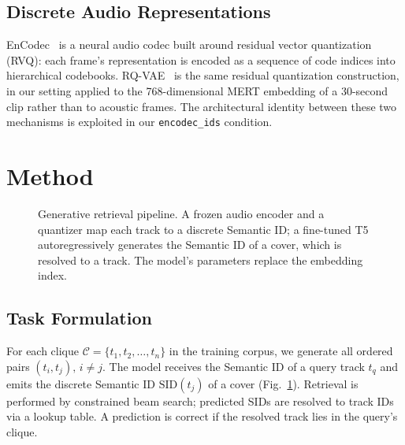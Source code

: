 \documentclass[conference]{IEEEtran}
\begin{document}
\subsection{Discrete Audio Representations}
EnCodec~\cite{defossez2022encodec} is a neural audio codec built around residual vector quantization (RVQ): each frame's representation is encoded as a sequence of code indices into hierarchical codebooks. RQ-VAE~\cite{lee2022rqvae, zeghidour2021soundstream} is the same residual quantization construction, in our setting applied to the 768-dimensional MERT embedding of a 30-second clip rather than to acoustic frames. The architectural identity between these two mechanisms is exploited in our \texttt{encodec\_ids} condition.

\section{Method}

\begin{figure}[t]
\centering
{}
\caption{Generative retrieval pipeline. A frozen audio encoder and a quantizer map each track to a discrete Semantic ID; a fine-tuned T5 autoregressively generates the Semantic ID of a cover, which is resolved to a track. The model's parameters replace the embedding index.}
\label{fig:pipeline}
\end{figure}

\subsection{Task Formulation}
For each clique $\mathcal{C} = \{t_1, t_2, \ldots, t_n\}$ in the training corpus, we generate all ordered pairs $(t_i, t_j),\, i \neq j$. The model receives the Semantic ID of a query track $t_q$ and emits the discrete Semantic ID $\mathrm{SID}(t_j)$ of a cover (Fig.~\ref{fig:pipeline}). Retrieval is performed by constrained beam search; predicted SIDs are resolved to track IDs via a lookup table. A prediction is correct if the resolved track lies in the query's clique.
\end{document}
